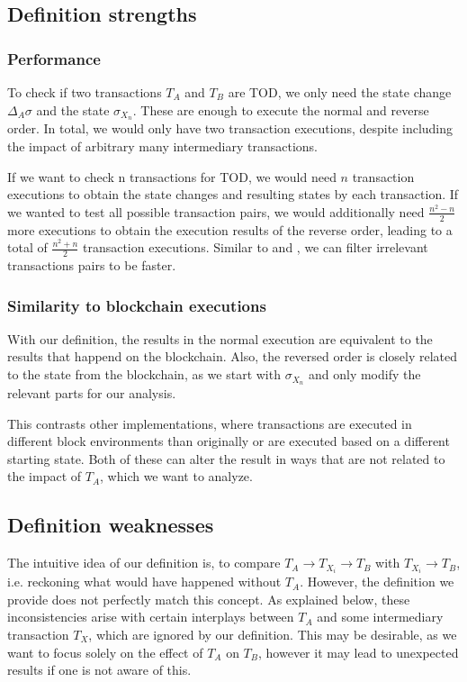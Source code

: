 \documentclass[draft,final]{vutinfth} %
\begin{document}
\subsection{Definition strengths}

\subsubsection{Performance}

To check if two transactions $T_A$ and $T_B$ are TOD, we only need the state change $\Delta_A\sigma$ and the state $\sigma_{X_n}$. These are enough to execute the normal and reverse order. In total, we would only have two transaction executions, despite including the impact of arbitrary many intermediary transactions.

If we want to check n transactions for TOD, we would need $n$ transaction executions to obtain the state changes and resulting states by each transaction. If we wanted to test all possible transaction pairs, we would additionally need $\frac{n^2 - n}{2}$ more executions to obtain the execution results of the reverse order, leading to a total of $\frac{n^2 + n}{2}$ transaction executions. Similar to \cite{torres_frontrunner_2021} and \cite{zhang_combatting_2023}, we can filter irrelevant transactions pairs to be faster.

\subsubsection{Similarity to blockchain executions}

With our definition, the results in the normal execution are equivalent to the results that happend on the blockchain. Also, the reversed order is closely related to the state from the blockchain, as we start with $\sigma_{X_n}$ and only modify the relevant parts for our analysis.

This contrasts other implementations, where transactions are executed in different block environments than originally or are executed based on a different starting state. Both of these can alter the result in ways that are not related to the impact of $T_A$, which we want to analyze.

\subsection{Definition weaknesses}

The intuitive idea of our definition is, to compare $T_A \rightarrow T_{X_i} \rightarrow T_B$ with $T_{X_i} \rightarrow T_B$, i.e. reckoning what would have happened without $T_A$. However, the definition we provide does not perfectly match this concept. As explained below, these inconsistencies arise with certain interplays between $T_A$ and some intermediary transaction $T_X$, which are ignored by our definition. This may be desirable, as we want to focus solely on the effect of $T_A$ on $T_B$, however it may lead to unexpected results if one is not aware of this.
\end{document}
